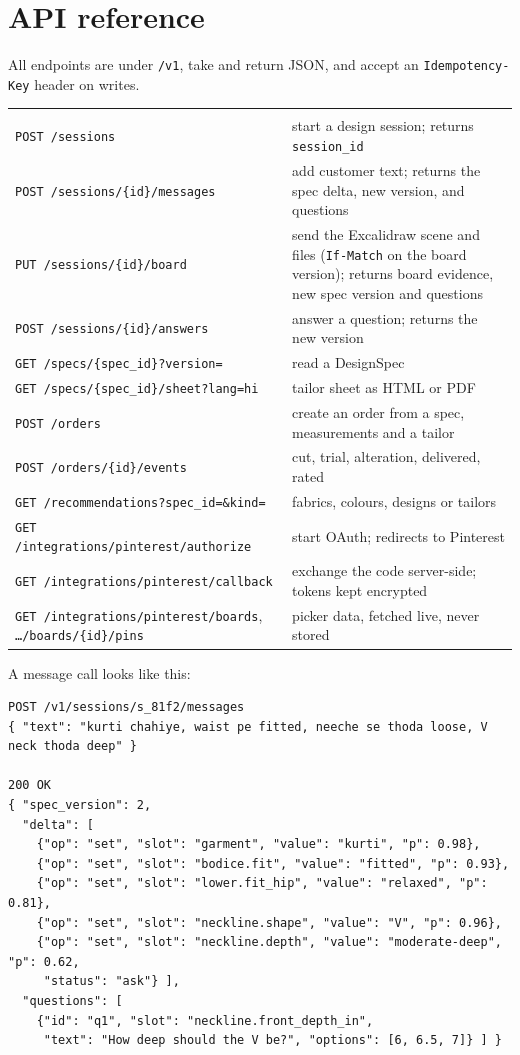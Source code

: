 \section{API reference}

All endpoints are under \texttt{/v1}, take and return JSON, and accept an \texttt{Idempotency-Key} header on writes.

\begin{table}[h]
\centering\small
\begin{tabularx}{\textwidth}{@{}P{6.0cm}L@{}}
 & \\
\texttt{POST /sessions} & start a design session; returns \texttt{session\_id}\\
\texttt{POST /sessions/\{id\}/messages} & add customer text; returns the spec delta, new version, and questions\\
\texttt{PUT /sessions/\{id\}/board} & send the Excalidraw scene and files (\texttt{If-Match} on the board version); returns board evidence, new spec version and questions\\
\texttt{POST /sessions/\{id\}/answers} & answer a question; returns the new version\\
\texttt{GET /specs/\{spec\_id\}?version=} & read a DesignSpec\\
\texttt{GET /specs/\{spec\_id\}/sheet?lang=hi} & tailor sheet as HTML or PDF\\
\texttt{POST /orders} & create an order from a spec, measurements and a tailor\\
\texttt{POST /orders/\{id\}/events} & cut, trial, alteration, delivered, rated\\
\texttt{GET /recommendations?spec\_id=\&kind=} & fabrics, colours, designs or tailors\\
\texttt{GET /integrations/pinterest/authorize} & start OAuth; redirects to Pinterest\\
\texttt{GET /integrations/pinterest/callback} & exchange the code server-side; tokens kept encrypted\\
\texttt{GET /integrations/pinterest/boards}, \texttt{\ldots/boards/\{id\}/pins} & picker data, fetched live, never stored\\
\end{tabularx}
\end{table}

A message call looks like this:

\begin{lstlisting}
POST /v1/sessions/s_81f2/messages
{ "text": "kurti chahiye, waist pe fitted, neeche se thoda loose, V neck thoda deep" }

200 OK
{ "spec_version": 2,
  "delta": [
    {"op": "set", "slot": "garment", "value": "kurti", "p": 0.98},
    {"op": "set", "slot": "bodice.fit", "value": "fitted", "p": 0.93},
    {"op": "set", "slot": "lower.fit_hip", "value": "relaxed", "p": 0.81},
    {"op": "set", "slot": "neckline.shape", "value": "V", "p": 0.96},
    {"op": "set", "slot": "neckline.depth", "value": "moderate-deep", "p": 0.62,
     "status": "ask"} ],
  "questions": [
    {"id": "q1", "slot": "neckline.front_depth_in",
     "text": "How deep should the V be?", "options": [6, 6.5, 7]} ] }
\end{lstlisting}

